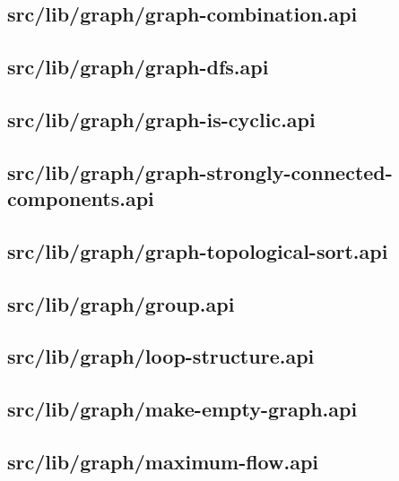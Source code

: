 \subsection{src/lib/graph/graph-combination.api}


\subsection{src/lib/graph/graph-dfs.api}


\subsection{src/lib/graph/graph-is-cyclic.api}


\subsection{src/lib/graph/graph-strongly-connected-components.api}


\subsection{src/lib/graph/graph-topological-sort.api}


\subsection{src/lib/graph/group.api}


\subsection{src/lib/graph/loop-structure.api}


\subsection{src/lib/graph/make-empty-graph.api}


\subsection{src/lib/graph/maximum-flow.api}


